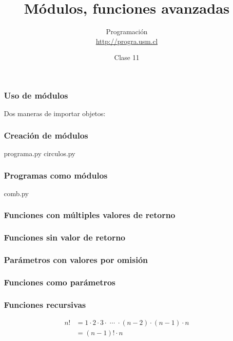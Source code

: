 \documentclass[12pt]{beamer}
\title{Módulos, funciones avanzadas}
\author{
  Programación \\ \url{http://progra.usm.cl}
}
\date{Clase 11}
\begin{document}
  \begin{frame}
    \maketitle
  \end{frame}

  \begin{frame}
    \frametitle{Uso de módulos}
    \label{uso-modulos}
    Dos maneras de importar objetos:
    \vfill
    \footnotesize
    
    
  \end{frame}

  \begin{frame}
    \frametitle{Creación de módulos}
    \label{creacion-modulos}
    programa.py
    {\footnotesize
    }
    \vfill
    circulos.py
    {\footnotesize
    }
  \end{frame}

  \begin{frame}
    \frametitle{Programas como módulos}
    \label{programa-modulo}
    comb.py
    \footnotesize
    
  \end{frame}

  \begin{frame}
    \frametitle{Funciones con múltiples valores de retorno}
    \label{mult-retornos}
    
    
  \end{frame}

  \begin{frame}
    \frametitle{Funciones sin valor de retorno}
    \label{sin-retorno}
    \footnotesize
    
  \end{frame}

  \begin{frame}
    \frametitle{Parámetros con valores por omisión}
    \label{parametros-por-omision}
    
    
  \end{frame}

  \begin{frame}
    \frametitle{Funciones como parámetros}
    \label{func-parametros}
    \footnotesize
    
  \end{frame}

  \begin{frame}
    \frametitle{Funciones recursivas}
    \label{func-recursivas}
    \begin{align*}
        n! &= 1\cdot 2\cdot 3\cdot\;\cdots\;\cdot (n - 2)\cdot (n - 1)\cdot n \\
           &=  (n - 1)! \cdot n
    \end{align*}
    \vfill
    
  \end{frame}
\end{document}
